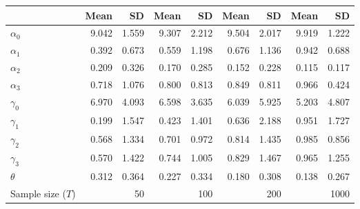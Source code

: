 
\begin{tabular}[t]{lrrrrrrrr}
\toprule
  & Mean & SD & Mean  & SD  & Mean   & SD   & Mean    & SD   \\
\midrule
$\alpha_{0}$ & 9.042 & 1.559 & 9.307 & 2.212 & 9.504 & 2.017 & 9.919 & 1.222\\
$\alpha_{1}$ & 0.392 & 0.673 & 0.559 & 1.198 & 0.676 & 1.136 & 0.942 & 0.688\\
$\alpha_{2}$ & 0.209 & 0.326 & 0.170 & 0.285 & 0.152 & 0.228 & 0.115 & 0.117\\
$\alpha_{3}$ & 0.718 & 1.076 & 0.800 & 0.813 & 0.849 & 0.811 & 0.966 & 0.424\\
$\gamma_{0}$ & 6.970 & 4.093 & 6.598 & 3.635 & 6.039 & 5.925 & 5.203 & 4.807\\
$\gamma_{1}$ & 0.199 & 1.547 & 0.423 & 1.401 & 0.636 & 2.188 & 0.951 & 1.727\\
$\gamma_{2}$ & 0.568 & 1.334 & 0.701 & 0.972 & 0.814 & 1.435 & 0.985 & 0.856\\
$\gamma_{3}$ & 0.570 & 1.422 & 0.744 & 1.005 & 0.829 & 1.467 & 0.965 & 1.255\\
$\theta$ & 0.312 & 0.364 & 0.227 & 0.334 & 0.180 & 0.308 & 0.138 & 0.267\\
Sample size ($T$) &  & 50 &  & 100 &  & 200 &  & 1000\\
\bottomrule
\end{tabular}
